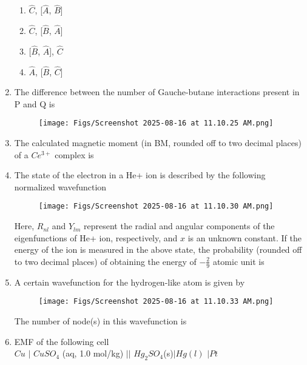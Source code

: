 \documentclass[12pt]{article}
\begin{document}
\begin{enumerate}
\begin{enumerate}
    \item {$\hat{C}$,  [{$\hat{A}$, $\hat{B}$}]}
    \item {$\hat{C}$,  [{$\hat{B}$, $\hat{A}$}]}
    \item {[{$\hat{B}$, $\hat{A}$}], $\hat{C}$}
    \item  {$\hat{A}$,  [{$\hat{B}$, $\hat{C}$}]}
\end{enumerate}

\item The difference between the number of Gauche-butane interactions present in P
and Q is 

\begin{figure}[H]
\centering
\texttt{[image: Figs/Screenshot 2025-08-16 at 11.10.25 AM.png]}
\caption{}
\end{figure}

\item The calculated magnetic moment (in BM, rounded off to two decimal places) of a
$Ce^{3+}$ complex is

\item The state of the electron in a He+ ion is described by the following normalized
wavefunction 
\begin{figure}[H]
\centering
\texttt{[image: Figs/Screenshot 2025-08-16 at 11.10.30 AM.png]}
\caption{}
\end{figure}

Here, $R_{nl}$ and $Y_{lm}$ represent the radial and angular components of the
eigenfunctions of He+ ion, respectively, and $x$ is an unknown constant. If the energy
of the ion is measured in the above state, the probability (rounded off to two decimal
places) of obtaining the energy of $-\frac{2}{9}$ atomic unit is

\item A certain wavefunction for the hydrogen-like atom is given by
\begin{figure}[H]
\centering
\texttt{[image: Figs/Screenshot 2025-08-16 at 11.10.33 AM.png]}
\caption{}
\end{figure}

The number of node(s) in this wavefunction is

\item EMF of the following cell \\

$Cu$ $ | $ $CuSO_4$ (aq, 1.0 mol/kg) $ ||$  $Hg_2SO_4$(s)$ | $$Hg(l)$ $ | $$Pt$ \\ 


\end{enumerate}
\end{document}
